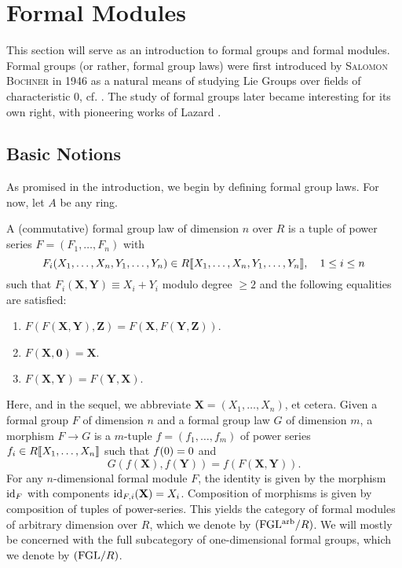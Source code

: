 \documentclass[../main.tex]{subfiles}
\begin{document}
\section{Formal Modules}
This section will serve as an introduction to formal groups and 
formal modules. Formal groups (or rather, formal group laws) were first
introduced by \textsc{Salomon Bochner} in 1946 as a natural means of studying Lie
Groups over fields of characteristic $0$, cf. \cite{Bochner1946FGrps}. 
The study of formal groups later became interesting for its own right, 
with pioneering works of Lazard \cite{Lazard1955FGrps}. 

\subsection{Basic Notions} %
\label{sub:Basic Notions}
As promised in the introduction, we begin by defining {formal group
laws}.
For now, let $A$ be any ring.
\begin{defi}
  A (commutative) formal group law  of dimension
  $n$ over $R$ is a tuple of
  power series $F = (F_1, \dots, F_n)$ with $$F_i(X_1, \dots, X_n,Y_1,
  \dots, Y_n) \in R\llbracket X_1, \dots,
  X_n, Y_1, \dots, Y_n\rrbracket, \quad 1 \leq i \leq n$$
  such that $F_i(\mathbf X, \mathbf Y) \equiv X_i + Y_i $ modulo degree $\geq 2$
  and the following equalities are satisfied:
  \begin{enumerate}
    \item $F(F (\mathbf X, \mathbf Y), \mathbf Z) = 
      F(\mathbf X, F(\mathbf Y, \mathbf Z))$.
    \item $F( \mathbf X, \mathbf 0) = \mathbf X$.
    \item $F( \mathbf X, \mathbf Y) = F(\mathbf Y, \mathbf X).$
  \end{enumerate}
  Here, and in the sequel, we abbreviate $\mathbf X =
  (X_1, \dots, X_n)$, et cetera.
  Given a formal group $F$ of dimension $n$ and a formal group law
  $G$ of dimension $m$,
  a morphism $F \to G$ is a $m$-tuple $f = (f_1, \dots, f_m)$ 
  of power series $f_i \in R\llbracket X_1, \dots, X_n \rrbracket$ such that ${f}(0)=0$ and
  \begin{equation*}
    G(f( \mathbf X), f( \mathbf Y) ) = f(F( \mathbf X, \mathbf Y)).
  \end{equation*}
  For any $n$-dimensional formal module $F$, the identity is given by 
  the morphism $\operatorname{id}_{F}$ with components $\operatorname{id}_{F,i}( \mathbf X) = X_i$. 
  Composition of morphisms is given by composition of tuples of power-series.
  This yields the category of formal modules of arbitrary dimension over $R$,
  which we denote by ${(\mathrm{FGL^{arb}}/{R})}$. We will mostly be concerned with the full
  subcategory of one-dimensional formal groups, which we denote by ${(\mathrm{FGL}/{R})}$. 
\end{defi}
\end{document}
